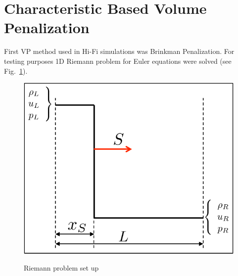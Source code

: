 \section{Characteristic Based Volume Penalization}
First VP method used in Hi-Fi simulations was Brinkman Penalization. For testing purposes 1D Riemann problem for Euler equations were solved (see Fig.~\ref{fig:riemann_euler}).
\begin{figure}[h!]
\centering \includegraphics[scale=0.5]{fig/Riemann_Euler.pdf}\\
\caption{Riemann problem set up \label{fig:riemann_euler}}
\end{figure}

